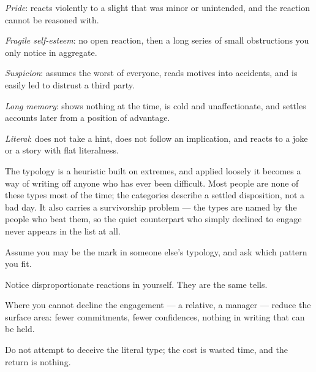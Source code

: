 \begin{feedback}
  \item \emph{Pride}: reacts violently to a slight that was minor or unintended, and the reaction cannot be reasoned with.
  \item \emph{Fragile self-esteem}: no open reaction, then a long series of small obstructions you only notice in aggregate.
  \item \emph{Suspicion}: assumes the worst of everyone, reads motives into accidents, and is easily led to distrust a third party.
  \item \emph{Long memory}: shows nothing at the time, is cold and unaffectionate, and settles accounts later from a position of advantage.
  \item \emph{Literal}: does not take a hint, does not follow an implication, and reacts to a joke or a story with flat literalness.
\end{feedback}

\begin{failure}
The typology is a heuristic built on extremes, and applied loosely it becomes a way of writing off anyone who has ever been difficult. Most people are none of these types most of the time; the categories describe a settled disposition, not a bad day. It also carries a survivorship problem --- the types are named by the people who beat them, so the quiet counterpart who simply declined to engage never appears in the list at all.
\end{failure}

\begin{countermeasures}
  \item Assume you may be the mark in someone else's typology, and ask which pattern you fit.
  \item Notice disproportionate reactions in yourself. They are the same tells.
  \item Where you cannot decline the engagement --- a relative, a manager --- reduce the surface area: fewer commitments, fewer confidences, nothing in writing that can be held.
  \item Do not attempt to deceive the literal type; the cost is wasted time, and the return is nothing.
\end{countermeasures}

\seesources
{}
